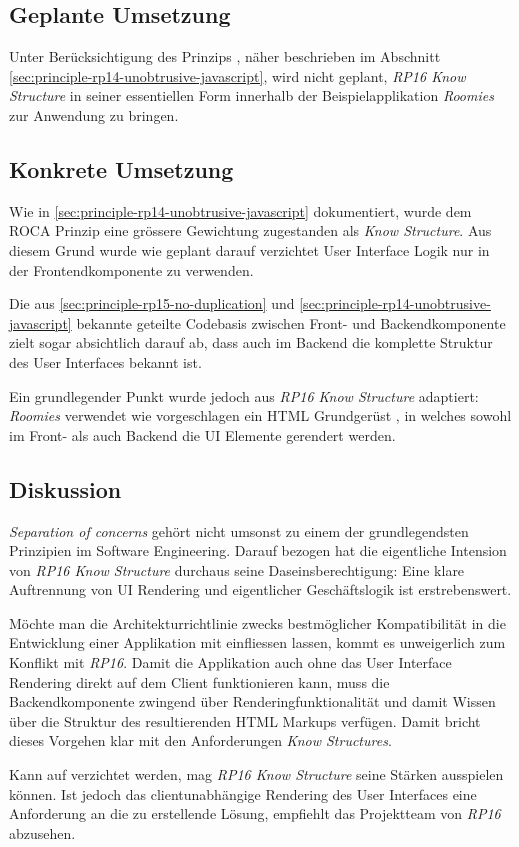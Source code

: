 \subsection*{Geplante Umsetzung}

Unter Berücksichtigung des Prinzips \emph{}, näher beschrieben im Abschnitt \ref{sec:principle-rp14-unobtrusive-javascript}, wird nicht geplant, \emph{RP16 Know Structure} in seiner essentiellen Form innerhalb der Beispielapplikation \emph{Roomies} zur Anwendung zu bringen.


\subsection*{Konkrete Umsetzung}

Wie in \ref{sec:principle-rp14-unobtrusive-javascript} dokumentiert, wurde dem ROCA Prinzip \emph{} eine grössere Gewichtung zugestanden als \emph{Know Structure}. Aus diesem Grund wurde wie geplant darauf verzichtet User Interface Logik nur in der Frontendkomponente zu verwenden.

Die aus \ref{sec:principle-rp15-no-duplication} und \ref{sec:principle-rp14-unobtrusive-javascript} bekannte geteilte Codebasis zwischen Front- und Backendkomponente zielt sogar absichtlich darauf ab, dass auch im Backend die komplette Struktur des User Interfaces bekannt ist.

Ein grundlegender Punkt wurde jedoch aus \emph{RP16 Know Structure} adaptiert: \emph{Roomies} verwendet wie vorgeschlagen ein HTML Grundgerüst \cite{roomiesHtmlSkeleton}, in welches sowohl im Front- als auch Backend die UI Elemente gerendert werden.


\subsection*{Diskussion}

\emph{Separation of concerns} \cite{SeparationOfConcerns} gehört nicht umsonst zu einem der grundlegendsten Prinzipien im Software Engineering. Darauf bezogen hat die eigentliche Intension von \emph{RP16 Know Structure} durchaus seine Daseinsberechtigung: Eine klare Auftrennung von UI Rendering und eigentlicher Geschäftslogik ist erstrebenswert.

Möchte man die Architekturrichtlinie \emph{} zwecks bestmöglicher Kompatibilität in die Entwicklung einer Applikation mit einfliessen lassen, kommt es unweigerlich zum Konflikt mit \emph{RP16}. Damit die Applikation auch ohne das User Interface Rendering direkt auf dem Client funktionieren kann, muss die Backendkomponente zwingend über Renderingfunktionalität und damit Wissen über die Struktur des resultierenden HTML Markups verfügen. Damit bricht dieses Vorgehen klar mit den Anforderungen \emph{Know Structures}.

Kann auf \emph{} verzichtet werden, mag \emph{RP16 Know Structure} seine Stärken ausspielen können. Ist jedoch das clientunabhängige Rendering des User Interfaces eine Anforderung an die zu erstellende Lösung, empfiehlt das Projektteam von \emph{RP16} abzusehen.
